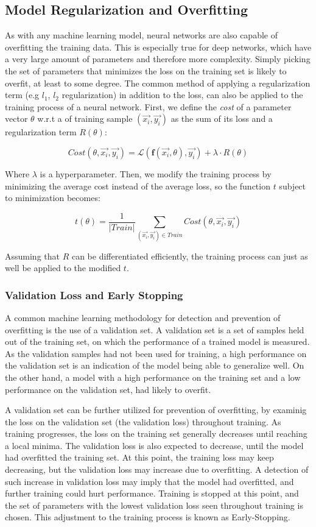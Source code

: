 \subsection{Model Regularization and Overfitting}

As with any machine learning model, neural networks are also capable of overfitting the training data. This is especially true for deep networks, which have a very large amount of parameters and therefore more complexity. Simply picking the set of parameters that minimizes the loss on the training set is likely to overfit, at least to some degree. The common method of applying a regularization term (e.g $l_1$, $l_2$ regularization) in addition to the loss, can also be applied to the training process of a neural network. First, we define the \emph{cost} of a parameter vector $\theta$ w.r.t a of training sample $(\vec{x_i}, \vec{y_i})$ as the sum of its loss and a regularization term $R(\theta)$:

$$ Cost(\theta, \vec{x_i}, \vec{y_i}) = \mathcal{L}(\textbf{f}(\vec{x_i}, \theta), \vec{y_i}) + \lambda \cdot R(\theta) $$

Where $\lambda$ is a hyperparameter. Then, we modify the training process by minimizing the average cost instead of the average loss, so the function $t$ subject to minimization becomes:

$$ t(\theta) = \frac{1}{|Train|}\sum_{(\vec{x_i}, \vec{y_i}) \in Train} Cost(\theta, \vec{x_i}, \vec{y_i}) $$

Assuming that $R$ can be differentiated efficiently, the training process can just as well be applied to the modified $t$.

\subsubsection{Validation Loss and Early Stopping}

A common machine learning methodology for detection and prevention of overfitting is the use of a validation set. A validation set is a set of samples held out of the training set, on which the performance of a trained model is measured. As the validation samples had not been used for training, a high performance on the validation set is an indication of the model being able to generalize well. On the other hand, a model with a high performance on the training set and a low performance on the validation set, had likely to overfit. 

A validation set can be further utilized for prevention of overfitting, by examinig the loss on the validation set (the validation loss) throughout training. As training progresses, the loss on the training set generally decreases until reaching a local minima. The validation loss is also expected to decrease, until the model had overfitted the training set. At this point, the training loss may keep decreasing, but the validation loss may increase due to overfitting. A detection of such increase in validation loss may imply that the model had overfitted, and further training could hurt performance. Training is stopped at this point, and the set of parameters with the lowest validation loss seen throughout training is chosen. This adjustment to the training process is known as Early-Stopping. 

